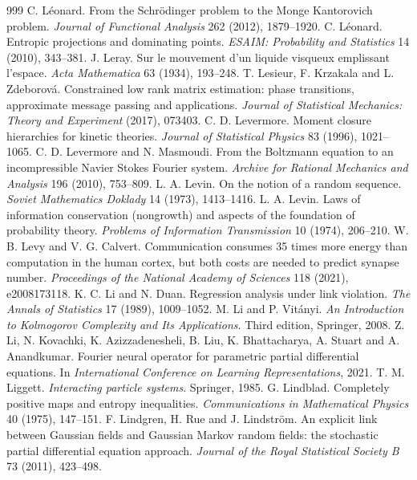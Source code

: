 \begin{thebibliography}{999}
 C. L\'eonard. From the Schr\"odinger problem to the Monge Kantorovich problem. \emph{Journal of Functional Analysis} 262 (2012), 1879--1920.
 C. L\'eonard. Entropic projections and dominating points. \emph{ESAIM: Probability and Statistics} 14 (2010), 343--381.
 J. Leray. Sur le mouvement d'un liquide visqueux emplissant l'espace. \emph{Acta Mathematica} 63 (1934), 193--248.
 T. Lesieur, F. Krzakala and L. Zdeborov\'a. Constrained low rank matrix estimation: phase transitions, approximate message passing and applications. \emph{Journal of Statistical Mechanics: Theory and Experiment} (2017), 073403.
 C. D. Levermore. Moment closure hierarchies for kinetic theories. \emph{Journal of Statistical Physics} 83 (1996), 1021--1065.
 C. D. Levermore and N. Masmoudi. From the Boltzmann equation to an incompressible Navier Stokes Fourier system. \emph{Archive for Rational Mechanics and Analysis} 196 (2010), 753--809.
 L. A. Levin. On the notion of a random sequence. \emph{Soviet Mathematics Doklady} 14 (1973), 1413--1416.
 L. A. Levin. Laws of information conservation (nongrowth) and aspects of the foundation of probability theory. \emph{Problems of Information Transmission} 10 (1974), 206--210.
 W. B. Levy and V. G. Calvert. Communication consumes 35 times more energy than computation in the human cortex, but both costs are needed to predict synapse number. \emph{Proceedings of the National Academy of Sciences} 118 (2021), e2008173118.
 K. C. Li and N. Duan. Regression analysis under link violation. \emph{The Annals of Statistics} 17 (1989), 1009--1052.
 M. Li and P. Vit\'anyi. \emph{An Introduction to Kolmogorov Complexity and Its Applications}. Third edition, Springer, 2008.
 Z. Li, N. Kovachki, K. Azizzadenesheli, B. Liu, K. Bhattacharya, A. Stuart and A. Anandkumar. Fourier neural operator for parametric partial differential equations. In \emph{International Conference on Learning Representations}, 2021.
 T. M. Liggett. \emph{Interacting particle systems}. Springer, 1985.
 G. Lindblad. Completely positive maps and entropy inequalities. \emph{Communications in Mathematical Physics} 40 (1975), 147--151.
 F. Lindgren, H. Rue and J. Lindstr\"om. An explicit link between Gaussian fields and Gaussian Markov random fields: the stochastic partial differential equation approach. \emph{Journal of the Royal Statistical Society B} 73 (2011), 423--498.

\end{thebibliography}
